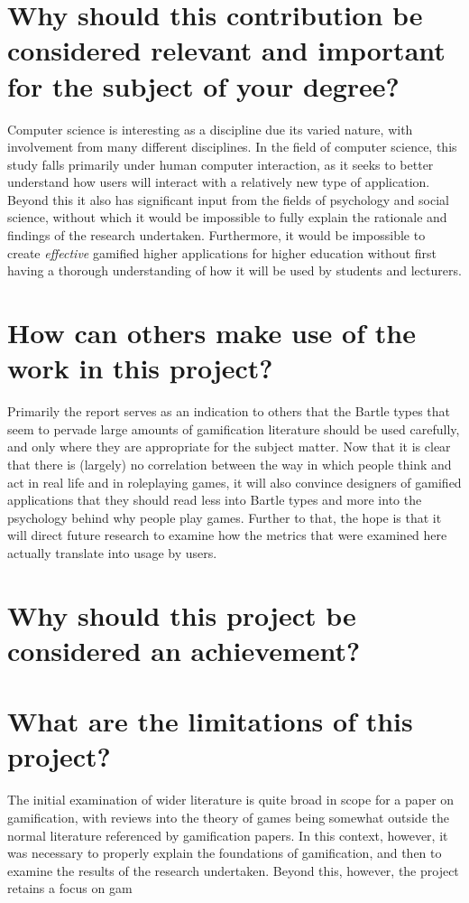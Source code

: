 \documentclass[12pt,a4paper,twoside]{report}
\begin{document}
\section{Why should this contribution be considered relevant and important for the subject of your degree?}
Computer science is interesting as a discipline due its varied nature, with involvement from many different disciplines. In the field of computer science, this study falls primarily under human computer interaction, as it seeks to better understand how users will interact with a relatively new type of application. Beyond this it also has significant input from the fields of psychology and social science, without which it would be impossible to fully explain the rationale and findings of the research undertaken. Furthermore, it would be impossible to create \textit{effective} gamified higher applications for higher education without first having a thorough understanding of how it will be used by students and lecturers.
\section{How can others make use of the work in this project?}
Primarily the report serves as an indication to others that the Bartle types that seem to pervade large amounts of gamification literature should be used carefully, and only where they are appropriate for the subject matter. Now that it is clear that there is (largely) no correlation between the way in which people think and act in real life and in roleplaying games, it will also convince designers of gamified applications that they should read less into Bartle types and more into the psychology behind why people play games. Further to that, the hope is that it will direct future research to examine how the metrics that were examined here actually translate into usage by users.
\section{Why should this project be considered an achievement?}

\section{What are the limitations of this project?}
The initial examination of wider literature is quite broad in scope for a paper on gamification, with reviews into the theory of games being somewhat outside the normal literature referenced by gamification papers. In this context, however, it was necessary to properly explain the foundations of gamification, and then to examine the results of the research undertaken. Beyond this, however, the project retains a focus on gam
\end{document}
